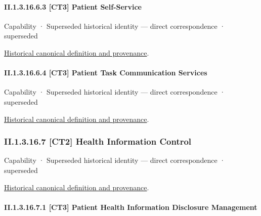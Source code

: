 \paragraph*{II.1.3.16.6.3 [CT3] Patient Self-Service}
\label{navigation:II.1.3.16.6.3}

\label{element:60f427e6b5764757b909624085a2af89}
{\small Capability · Superseded historical identity — direct correspondence · superseded}\par
\href{../../../../continuum/strategy/capability/60f427e6b5764757b909624085a2af89.md}{Historical canonical definition and provenance}.\par
\paragraph*{II.1.3.16.6.4 [CT3] Patient Task Communication Services}
\label{navigation:II.1.3.16.6.4}

\label{element:0914f2bb267449e282e9ae0f7407d9fe}
{\small Capability · Superseded historical identity — direct correspondence · superseded}\par
\href{../../../../continuum/strategy/capability/0914f2bb267449e282e9ae0f7407d9fe.md}{Historical canonical definition and provenance}.\par
\subsubsection*{II.1.3.16.7 [CT2] Health Information Control}
\label{navigation:II.1.3.16.7}

\label{element:a3196aef21d443519de874c24f64a185}
{\small Capability · Superseded historical identity — direct correspondence · superseded}\par
\href{../../../../continuum/strategy/capability/a3196aef21d443519de874c24f64a185.md}{Historical canonical definition and provenance}.\par
\paragraph*{II.1.3.16.7.1 [CT3] Patient Health Information Disclosure Management}
\label{navigation:II.1.3.16.7.1}

